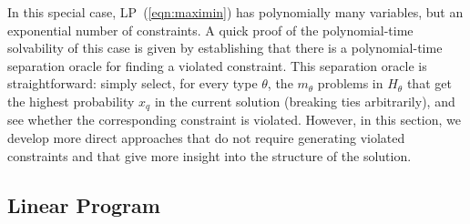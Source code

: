 \documentclass{article}
\begin{document}
In this special case, LP~(\ref{eqn:maximin}) has polynomially many
variables, but an exponential number of constraints.  A quick proof of the
polynomial-time solvability of this case is given by establishing that
there is a polynomial-time separation oracle for finding a violated constraint.
This separation oracle is straightforward: simply select, for every type
$\theta$, the $m_\theta$ problems in $H_\theta$ that get the highest
probability $x_q$ in the current solution (breaking ties arbitrarily), and
see whether the corresponding constraint is violated.  However, in this
section, we develop more direct approaches that do not require generating
violated constraints and that give more insight into the structure of the solution.




\subsection{Linear Program}
\end{document}
